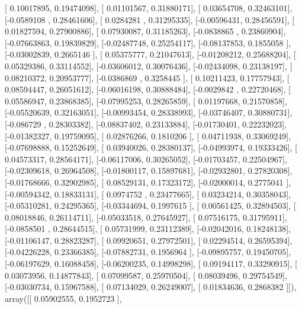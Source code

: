\documentclass{article}
\begin{document}
       [ 0.10017895,  0.19474098],
       [ 0.01101567,  0.31880171],
       [ 0.03654708,  0.32463101],
       [-0.0589108 ,  0.28461606],
       [ 0.0284281 ,  0.31295335],
       [-0.00596431,  0.28456591],
       [ 0.01827594,  0.27900886],
       [ 0.07930087,  0.31185263],
       [-0.0838865 ,  0.23860904],
       [-0.07663863,  0.19839829],
       [-0.02487748,  0.25254117],
       [-0.08137853,  0.1855058 ],
       [-0.03002839,  0.2665146 ],
       [ 0.05375777,  0.21047613],
       [-0.01208212,  0.25688204],
       [ 0.05329386,  0.33114552],
       [-0.03606012,  0.30076436],
       [-0.02434098,  0.23138197],
       [ 0.08210372,  0.20953777],
       [-0.0386869 ,  0.3258445 ],
       [ 0.10211423,  0.17757943],
       [ 0.08594447,  0.26051612],
       [-0.06016198,  0.30888484],
       [-0.0029842 ,  0.22720468],
       [ 0.05586947,  0.23868385],
       [-0.07995253,  0.28265859],
       [ 0.01197668,  0.21570858],
       [-0.05520639,  0.32163051],
       [-0.00993454,  0.28338993],
       [-0.03746407,  0.30880731],
       [-0.086729  ,  0.28303382],
       [-0.08837402,  0.23133884],
       [-0.01730401,  0.22232023],
       [-0.01382327,  0.19759095],
       [ 0.02876266,  0.1810206 ],
       [ 0.04711938,  0.33069249],
       [-0.07698888,  0.15252649],
       [ 0.03940026,  0.28380137],
       [-0.04993974,  0.19333426],
       [ 0.04573317,  0.28564171],
       [-0.06117006,  0.30265052],
       [-0.01703457,  0.22504967],
       [-0.02309618,  0.26964508],
       [-0.01800117,  0.15897681],
       [-0.02932801,  0.27820308],
       [-0.01768666,  0.32902985],
       [ 0.08529131,  0.17323172],
       [-0.02000014,  0.2775041 ],
       [-0.00594342,  0.18833131],
       [ 0.0974752 ,  0.23477665],
       [ 0.03234214,  0.30358043],
       [-0.05310281,  0.24295365],
       [-0.03344694,  0.1997615 ],
       [ 0.00561425,  0.32894503],
       [ 0.08018846,  0.26114711],
       [-0.05033518,  0.27645927],
       [ 0.07516175,  0.31795911],
       [-0.0858501 ,  0.28644515],
       [ 0.05731999,  0.23112389],
       [-0.02042016,  0.18248138],
       [-0.01106147,  0.28823287],
       [ 0.09920651,  0.27972501],
       [ 0.02294514,  0.26595394],
       [-0.04226228,  0.23366385],
       [-0.07882731,  0.1956964 ],
       [-0.09895757,  0.19450705],
       [-0.06197629,  0.16088458],
       [-0.06200235,  0.14998298],
       [ 0.09194117,  0.33290915],
       [ 0.03073956,  0.14877843],
       [ 0.07099587,  0.25970504],
       [ 0.08039496,  0.29754549],
       [-0.03030734,  0.15967588],
       [ 0.07134029,  0.26249007],
       [ 0.01834636,  0.2868382 ]]), array([[ 0.05902555,  0.1952723 ],
\end{document}
